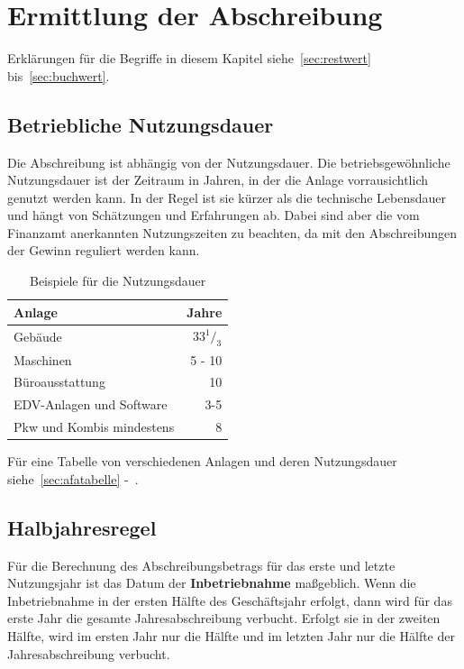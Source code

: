 \documentclass[a4paper,10pt]{report}
\begin{document}
\chapter{Ermittlung der Abschreibung}
\thispagestyle{fancy}
Erklärungen für die Begriffe in diesem Kapitel
siehe~\autoref{sec:restwert} bis~\autoref{sec:buchwert}.

\section{Betriebliche Nutzungsdauer}
Die Abschreibung ist abhängig von der Nutzungsdauer. Die
betriebsgewöhnliche Nutzungsdauer ist der Zeitraum in Jahren, in der
die Anlage vorrausichtlich genutzt werden kann. In der Regel ist sie
kürzer als die technische Lebensdauer und hängt von Schätzungen und
Erfahrungen ab. Dabei sind aber die vom Finanzamt anerkannten
Nutzungszeiten zu beachten, da mit den Abschreibungen der Gewinn
reguliert werden kann.

\begin{table}[h]
  \centering
  \begin{tabular}{l r}
    Anlage & Jahre\\
    \hline
    Gebäude & 33$^1/_3$\\
    Maschinen & 5 - 10\\
    Büroausstattung & 10\\
    EDV-Anlagen und Software & 3-5\\
    Pkw und Kombis mindestens & 8\\
  \end{tabular}
  \caption{Beispiele für die Nutzungsdauer}
\end{table}

Für eine Tabelle von verschiedenen Anlagen und deren Nutzungsdauer
siehe~\autoref{sec:afatabelle} -~.

\section{Halbjahresregel}
\label{sec:halbjahresregel}
Für die Berechnung des Abschreibungsbetrags für das erste und letzte
Nutzungsjahr ist das Datum der \textbf{Inbetriebnahme}
maßgeblich. Wenn die Inbetriebnahme in der ersten Hälfte des
Geschäftsjahr erfolgt, dann wird für das erste Jahr die gesamte
Jahresabschreibung verbucht. Erfolgt sie in der zweiten Hälfte, wird
im ersten Jahr nur die Hälfte und im letzten Jahr nur die Hälfte der
Jahresabschreibung verbucht.
\end{document}
